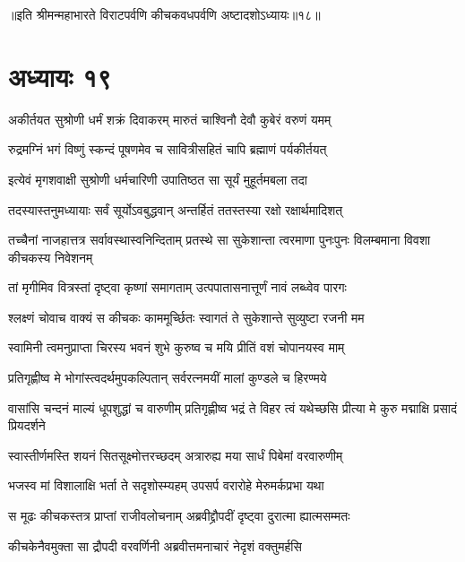 ॥इति श्रीमन्महाभारते विराटपर्वणि कीचकवधपर्वणि अष्टादशोऽध्यायः॥१८॥

\chapter{अध्यायः १९}

\twolineshloka
{अकीर्तयत सुश्रोणी धर्मं शक्रं दिवाकरम्}
{मारुतं चाश्विनौ देवौ कुबेरं वरुणं यमम्}


\twolineshloka
{रुद्रमग्निं भगं विष्णुं स्कन्दं पूषणमेव च}
{सावित्रीसहितं चापि ब्रह्माणं पर्यकीर्तयत्}


\twolineshloka
{इत्येवं मृगशवाक्षी सुश्रोणी धर्मचारिणी}
{उपातिष्ठत सा सूर्यं मुहूर्तमबला तदा}


\twolineshloka
{तदस्यास्तनुमध्यायाः सर्वं सूर्योऽवबुद्धवान्}
{अन्तर्हितं ततस्तस्या रक्षो रक्षार्थमादिशत्}


\onelineshloka
{तच्चैनां नाजहात्तत्र सर्वावस्थास्वनिन्दिताम्}
\twolineshloka
{प्रतस्थे सा सुकेशान्ता त्वरमाणा पुनःपुनः}
{विलम्बमाना विवशा कीचकस्य निवेशनम्}


\twolineshloka
{तां मृगीमिव वित्रस्तां दृष्ट्वा कृष्णां समागताम्}
{उत्पपातासनात्तूर्णं नावं लब्ध्वेव पारगः}


\twolineshloka
{श्लक्ष्णं चोवाच वाक्यं स कीचकः काममूर्च्छितः}
{स्वागतं ते सुकेशान्ते सुव्युष्टा रजनी मम}


\twolineshloka
{स्वामिनी त्वमनुप्राप्ता चिरस्य भवनं शुभे}
{कुरुष्व च मयि प्रीतिं वशं चोपानयस्व माम्}


\twolineshloka
{प्रतिगृह्णीष्व मे भोगांस्त्वदर्थमुपकल्पितान्}
{सर्वरत्नमयीं मालां कुण्डले च हिरण्मये}





\threelineshloka
{वासांसि चन्दनं माल्यं धूपशुद्धां च वारुणीम्}
{प्रतिगृह्णीष्व भद्रं ते विहर त्वं यथेच्छसि}
{प्रीत्या मे कुरु मद्माक्षि प्रसादं प्रियदर्शने}


\twolineshloka
{स्वास्तीर्णमस्ति शयनं सितसूक्ष्मोत्तरच्छदम्}
{अत्रारुह्य मया सार्धं पिबेमां वरवारुणीम्}


\twolineshloka
{भजस्व मां विशालाक्षि भर्ता ते सदृशोस्म्यहम्}
{उपसर्प वरारोहे मेरुमर्कप्रभा यथा}



\twolineshloka
{स मूढः कीचकस्तत्र प्राप्तां राजीवलोचनाम्}
{अब्रवीद्द्रौपदीं दृष्ट्वा दुरात्मा ह्यात्मसम्मतः}


\twolineshloka
{कीचकेनैवमुक्ता सा द्रौपदी वरवर्णिनी}
{अब्रवीत्तमनाचारं नेदृशं वक्तुमर्हसि}


